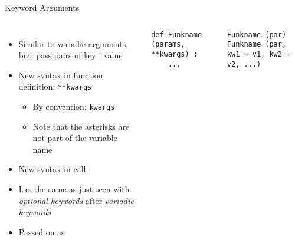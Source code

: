 \begin{frame}[fragile]{Keyword Arguments}
%
\begin{columns}[T]
\begin{itemize}
\item Similar to variadic arguments, but: pass pairs of key : value
\item New syntax in function definition: \texttt{**kwargs}
	\begin{itemize}
	\item By convention: \texttt{kwargs}
	\item Note that the asterisks are not part of the variable name
	\end{itemize}
\item New syntax in call: 
\item I.\,e. the same as just seen with \emph{optional keywords} after \emph{variadic keywords}
\item Passed on as 
\end{itemize}
%
\begin{codebox}
\begin{verbatim}
def Funkname (params, **kwargs) :
    ...
\end{verbatim}
\end{codebox}
%
\begin{codebox}
\begin{verbatim}
Funkname (par)
Funkname (par, kw1 = v1, kw2 = v2, ...)
\end{verbatim}
\end{codebox}
\end{columns}
%
\end{frame}


